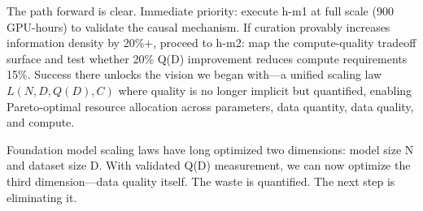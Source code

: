 The path forward is clear. Immediate priority: execute h-m1 at full scale (900 GPU-hours) to validate the causal mechanism. If curation provably increases information density by 20\%+, proceed to h-m2: map the compute-quality tradeoff surface and test whether 20\% Q(D) improvement reduces compute requirements 15\%. Success there unlocks the vision we began with---a unified scaling law $L(N, D, Q(D), C)$ where quality is no longer implicit but quantified, enabling Pareto-optimal resource allocation across parameters, data quantity, data quality, and compute.

Foundation model scaling laws have long optimized two dimensions: model size N and dataset size D. With validated Q(D) measurement, we can now optimize the third dimension---data quality itself. The waste is quantified. The next step is eliminating it.
